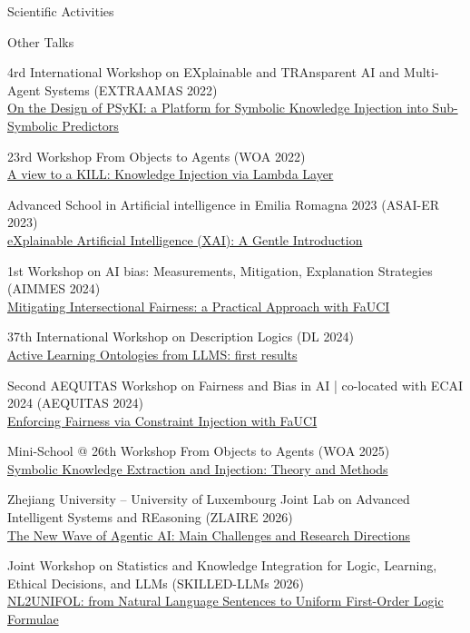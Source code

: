 \documentclass{resume} %
\begin{document}
\begin{rSection}{Scientific Activities}
        \begin{rSubsection2}{Other Talks}
            \item 4rd International Workshop on EXplainable and TRAnsparent AI and Multi-Agent Systems (EXTRAAMAS 2022)
            \\\href{https://apice.unibo.it/xwiki/bin/view/Talk/PsykiExtraamas2022}{On the Design of PSyKI: a Platform for Symbolic Knowledge Injection into Sub-Symbolic Predictors}
            \item 23rd Workshop From Objects to Agents (WOA 2022)
            \\\href{https://apice.unibo.it/xwiki/bin/view/Talk/KillWoa2022}{A view to a KILL: Knowledge Injection via Lambda Layer}
            \item Advanced School in Artificial intelligence in Emilia Romagna 2023 (ASAI-ER 2023)
            \\\href{https://apice.unibo.it/xwiki/bin/view/Talk/XaiAsaiErBertinoro2023}{eXplainable Artificial Intelligence (XAI): A Gentle Introduction}
            \item 1st Workshop on AI bias: Measurements, Mitigation, Explanation Strategies (AIMMES 2024)
            \\\href{https://apice.unibo.it/xwiki/bin/view/Talk/IntersectionalityAimmes2024}{Mitigating Intersectional Fairness: a Practical Approach with FaUCI}
            \item 37th International Workshop on Description Logics (DL 2024)
            \\\href{https://dl2024.w.uib.no/overview/}{Active Learning Ontologies from LLMS: first results}
            \item Second AEQUITAS Workshop on Fairness and Bias in AI | co-located with ECAI 2024 (AEQUITAS 2024)
            \\\href{https://apice.unibo.it/xwiki/bin/view/Talk/FauciAequitas2024}{Enforcing Fairness via Constraint Injection with FaUCI}
            \item Mini-School @ 26th Workshop From Objects to Agents (WOA 2025)
            \\\href{https://sites.google.com/view/woa2025/mini-school?}{Symbolic Knowledge Extraction and Injection: Theory and Methods}
            \item Zhejiang University – University of Luxembourg Joint Lab on Advanced Intelligent Systems and REasoning (ZLAIRE 2026)
            \\\href{https://www.zlaire.net/}{The New Wave of Agentic AI: Main Challenges and Research Directions}
            \item Joint Workshop on Statistics and Knowledge Integration for Logic, Learning, Ethical Decisions, and LLMs (SKILLED-LLMs 2026)
            \\\href{https://skilled-llms.github.io/2026/accepted/#:~:text=Systems%0AF.%20Sabbatini-,NL2UNIFOL,-%3A%20from%20Natural%20Language}{NL2UNIFOL: from Natural Language Sentences to Uniform First-Order Logic Formulae}
        \end{rSubsection2}



\end{rSection}
\end{document}
